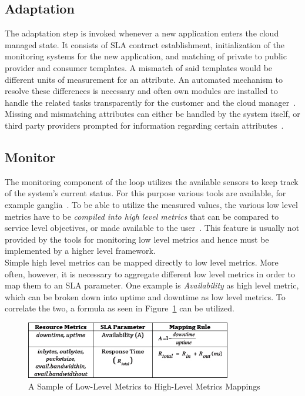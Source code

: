 \documentclass[a4paper]{llncs}
\begin{document}
\subsection{Adaptation}
\label{sec:adaption}
The adaptation step is invoked whenever a new application enters the cloud managed state. It consists of SLA contract establishment, initialization of the monitoring systems for the new application, and matching of private to public provider and consumer templates. A mismatch of said templates would be different units of measurement for an attribute. An automated mechanism to resolve these differences is necessary and often own modules are installed to handle the related tasks transparently for the customer and the cloud manager~\cite{Freitas10}. Missing and mismatching attributes can either be handled by the system itself, or third party providers prompted for information regarding certain attributes~\cite{Maurer11}. 

\subsection{Monitor}
The monitoring component of the loop utilizes the available sensors to keep track of the system’s current status. For this purpose various tools are available, for example ganglia~\cite{Massie04}. To be able to utilize the measured values, the various low level metrics have to be \textit{compiled into high level metrics} that can be compared to service level objectives, or made available to the user~\cite{Maurer11}. This feature is usually not provided by the tools for monitoring low level metrics and hence must be implemented by a higher level framework.\\

Simple high level metrics can be mapped directly to low level metrics. More often, however, it is necessary to aggregate different low level metrics in order to map them to an SLA parameter. One example is \textit{Availability} as high level metric, which can be broken down into uptime and downtime as low level metrics. To correlate the two, a formula as seen in Figure~\ref{fig:lo2hi} can be utilized.\\

\begin{figure}[Ht]
	\centering
		\includegraphics[width=0.8\textwidth]{figs/lo2hi.jpg}
	\caption{A Sample of Low-Level Metrics to High-Level Metrics Mappings}
	\label{fig:lo2hi}
\end{figure}
\end{document}
